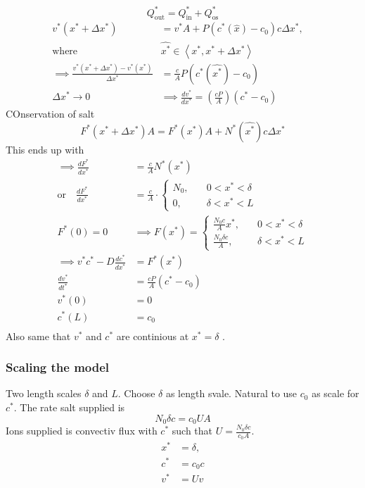 \documentclass{article}
\theoremstyle{remark}
\begin{document}
\[
Q^{*} _{\text{out}} = Q^{* } _{\text{in}} + Q^{*}_{\text{os}}
\] 
\[
\begin{split}
  v^{*} \left( x^{*} + \Delta x^{*} \right) &= v^{*}A + P\left( c^{*}\left( \hat{x} \right) - c_{0} \right) c \Delta x^{*}, \quad \\
   \text{where }  &   \hat{x^{*}} \in \left<x^{*}, x^{*} + \Delta x^{*}  \right>   \\
  \implies  \frac{v^{*} \left( x^{*} + \Delta x^{*}   \right) - v^{*} \left( x^{*} \right)}{\Delta x^{*}}  &= \frac{c}{A}  P\left( c^{*}\left( \hat{x^{*}}   \right) - c_{0} \right) \\
  \Delta  x^{*} \to  0  \quad   &  \implies  \frac{d v^{*}}{d x^{*}}  = \left( \frac{cP}{A}   \right) \left( c^{*} - c_{0} \right)
\end{split} 
\] 
COnservation of salt \[
F^{*} \left( x^{*} + \Delta x^{*} \right) A = F^{*}\left( x^{*} \right)A + N^{*}\left( \hat{x^{*}} \right) c \Delta x^{*}
\] 
This ends up with \[
\begin{split}
  \implies  \frac{d F^{*}}{d x^{*}}  &= \frac{c}{A} N^{*}\left( x^{*} \right) \\
  \text{or} \quad \frac{d F^{*}}{d x^{*}}   &= \frac{c}{A} \cdot \begin{cases}
    N_{0},  &  \quad  0 < x^{*} < \delta \\
    0,   & \quad \delta < x^{*} < L   
  \end{cases} \\
  F^{*}\left( 0 \right) = 0 \quad  &  \implies  F\left( x^{*} \right) = \begin{cases}
    \frac{N_{0} c}{A}  x^{*} , \quad  &  0 <  x ^{* } < \delta \\
    \frac{N_{0} \delta  c}{A} , \quad   &  \delta < x^{* } < L    
  \end{cases}  \\
  \implies  v^{*} c^{*} - D \frac{d c^{*}}{d x^{*}}  &=  F^{*}\left( x^{*} \right) \\
  \frac{d v^{*}}{d t^{*}}  &= \frac{cP}{A} \left( c^{*} - c_{0} \right) \\
  v^{*}\left( 0 \right) &=  0 \\
  c^{*}\left( L \right)  & = c_{0} \\
\end{split} 
\] 
Also same that $v^{*}$ and $c^{*}$ are continious at $x^{*} = \delta $ .

\subsubsection{Scaling the model}%
\label{ssub:scaling_the_model}
Two length scales $\delta $ and $L$. Choose $\delta $ as length svale. Natural to use $c_{0}$ as scale for $c^{*}$. The rate salt supplied is \[
N_{0} \delta  c = c_{0} UA
\] 
Ions supplied is convectiv flux with $c^{*}$ such that $U = \frac{N_{0} \delta c}{c_{0} A} $. 
\[
  \begin{split}
  x^{*}  & = \delta ,\\
    c^{*}   & = c_{0} c \\
v^{*} &=  U v \\
  \end{split} 
\] 
\end{document}
